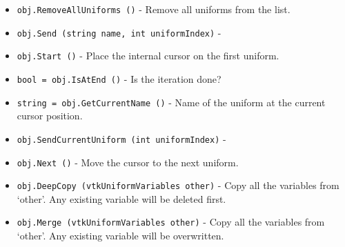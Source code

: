 \begin{itemize}
\item  \verb|obj.RemoveAllUniforms ()| -  Remove all uniforms from the list.

\item  \verb|obj.Send (string name, int uniformIndex)| -  

\item  \verb|obj.Start ()| -  Place the internal cursor on the first uniform.

\item  \verb|bool = obj.IsAtEnd ()| -  Is the iteration done?

\item  \verb|string = obj.GetCurrentName ()| -  Name of the uniform at the current cursor position.
 

\item  \verb|obj.SendCurrentUniform (int uniformIndex)| -  
 

\item  \verb|obj.Next ()| -  Move the cursor to the next uniform.
 

\item  \verb|obj.DeepCopy (vtkUniformVariables other)| -  Copy all the variables from `other'. Any existing variable will be
 deleted first.
 
 

\item  \verb|obj.Merge (vtkUniformVariables other)| -  Copy all the variables from `other'. Any existing variable will be
 overwritten.
 
 

\end{itemize}
